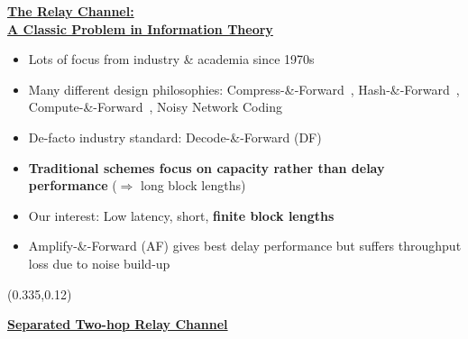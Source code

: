 \documentclass[pdf]{beamer}
\begin{document}
\begin{frame}[t]
\begin{textblock}{0.33}
\hrulefill

\begin{center}
  \ul{\textbf{The Relay Channel:}}\\
      \ul{\textbf{A Classic Problem in Information Theory}}
\end{center}
\begin{itemize}
\item Lots of focus from industry \& academia since 1970s
\end{itemize}
\begin{center}
\end{center}
\begin{itemize}
\item Many different design philosophies: Compress-\&-Forward~\cite{cover-elgamal-relay}, Hash-\&-Forward~\cite{cover-kim-deterministic}, Compute-\&-Forward~\cite{nazer-compute-f}, Noisy Network Coding~\cite{lim-nnc}
\item De-facto industry standard: Decode-\&-Forward (DF)~\cite{cover-elgamal-relay}
\item \textbf{Traditional schemes focus on capacity rather than delay performance} ($\Rightarrow$ long block lengths)
\item Our interest: Low latency, short, \textbf{finite block lengths}
\item Amplify-\&-Forward (AF) gives best delay performance but suffers throughput loss due to noise build-up
\end{itemize}
\end{textblock}

\begin{textblock}{0.33}(0.335,0.12)
  \begin{center}
    \ul{\textbf{Separated Two-hop Relay Channel}}


\end{center}
\end{textblock}
\end{frame}
\end{document}
